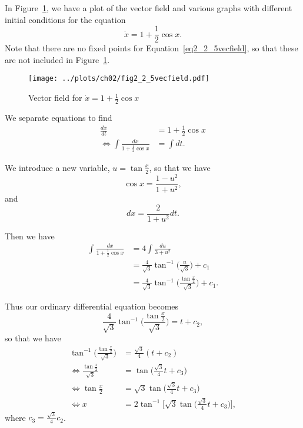 
In Figure~\ref{fig2_2_5vecfield}, we have a plot of the vector field and various graphs 
with different initial conditions for the equation 
\begin{equation}
    \dot{x} = 1 + \frac{1}{2}\cos{x}.
    \label{eq2_2_5vecfield}
\end{equation}
Note that there are no fixed points for Equation~\eqref{eq2_2_5vecfield}, so that these 
are not included in Figure~\ref{fig2_2_5vecfield}.
\begin{figure}[!ht]
    \texttt{[image: ../plots/ch02/fig2\_2\_5vecfield.pdf]}
    \caption{Vector field for $\dot{x} = 1 + \frac{1}{2}\cos{x}$
        \label{fig2_2_5vecfield}}
\end{figure}

We separate equations to find
\begin{equation*}
    \begin{split}
        \frac{dx}{dt} &= 1 + \frac{1}{2}\cos{x} \\
        \Leftrightarrow \int \frac{dx}{1 + \frac{1}{2}\cos{x}} &= \int dt.
    \end{split}
\end{equation*}

We introduce a new variable, $u = \tan{\frac{x}{2}}$, so that we have
\[
    \cos{x} = \frac{1 - u^2}{1 + u^2},
\]
and
\[
    dx = \frac{2}{1 + u^2}dt.
\]

Then we have
\begin{equation*}
    \begin{split}
        \int \frac{dx}{1 + \frac{1}{2}\cos{x}} &= 4\int \frac{du}{3 + u^2} \\
                                               &= \frac{4}{\sqrt{3}}\tan^{-1}
                                               {\biggl(\frac{u}{\sqrt{3}}\biggr)} + c_1 \\
                                               &= \frac{4}{\sqrt{3}}\tan^{-1}
                                               {\biggl(\frac{\tan{\frac{x}{2}}}{\sqrt{3}}\biggr)}
                                               + c_1.
    \end{split}
\end{equation*}

Thus our ordinary differential equation becomes
\[
    \frac{4}{\sqrt{3}}\tan^{-1}{\biggl(\frac{\tan{\frac{x}{2}}}{\sqrt{3}}\biggr)}
    = t + c_2, 
\]
so that we have
\begin{equation*}
    \begin{split}
        \tan^{-1}{\biggl(\frac{\tan{\frac{x}{2}}}{\sqrt{3}}\biggr)}
        &= \frac{\sqrt{3}}{4}(t + c_2) \\
        \Leftrightarrow \frac{\tan{\frac{x}{2}}}{\sqrt{3}}
        &= \tan{\biggl(\frac{\sqrt{3}}{4}t + c_3\biggr)} \\
        \Leftrightarrow \tan{\frac{x}{2}}
        &= \sqrt{3}\tan{\biggl(\frac{\sqrt{3}}{4}t + c_3\biggr)} \\
        \Leftrightarrow x
        &= 2\tan^{-1}\biggl[\sqrt{3}\tan{\biggl(\frac{\sqrt{3}}{4}t + c_3\biggr)} \biggr],
    \end{split}
\end{equation*}
where $c_3 = \frac{\sqrt{3}}{4}c_2$.

